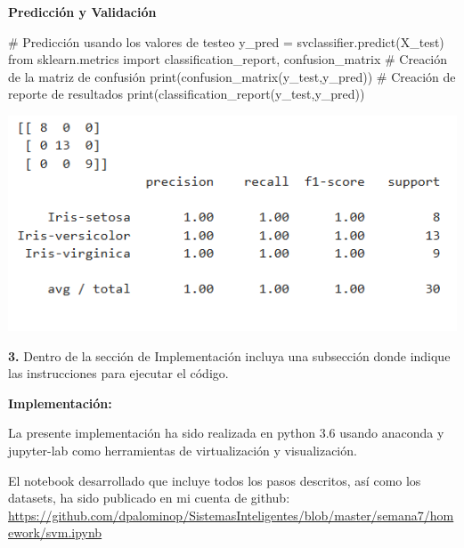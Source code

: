 \documentclass[paper=a4, fontsize=11pt]{scrartcl}
\numberwithin{equation}{section}		%
\numberwithin{figure}{section}			%
\numberwithin{table}{section}				%
\begin{document}
    \textbf{Predicción y Validación}
    
    \begin{python}
    # Predicción usando los valores de testeo
    y_pred = svclassifier.predict(X_test)
    from sklearn.metrics import classification_report, confusion_matrix
    # Creación de la matriz de confusión
    print(confusion_matrix(y_test,y_pred))
    # Creación de reporte de resultados
    print(classification_report(y_test,y_pred))
    \end{python}
    
    \includegraphics[scale=0.8]{gaussiano_c_50}
    \newpage
    
    \textbf{3.} Dentro de la sección de Implementación incluya una subsección donde indique las instrucciones para ejecutar el código.
    
    \textbf{Implementación:}
    
    La presente implementación ha sido realizada en python 3.6 usando anaconda y jupyter-lab como herramientas de virtualización y visualización.
    
    El notebook desarrollado que incluye todos los pasos descritos, así como los datasets, ha sido publicado en mi cuenta de github:\\
    
    \url{https://github.com/dpalominop/SistemasInteligentes/blob/master/semana7/homework/svm.ipynb}

\end{document}
